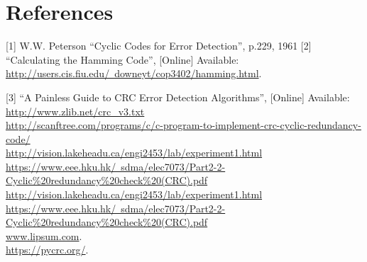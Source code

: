\documentclass[10pt,twocolumn,letterpaper]{article}
\begin{document}
\section{References}
[1]   W.W. Peterson “Cyclic Codes for Error Detection”, p.229, 1961 
[2] “Calculating the Hamming Code”, [Online] Available: 
\href{http://users.cis.fiu.edu/~downeyt/cop3402/hamming.html}{http://users.cis.fiu.edu/~downeyt/cop3402/hamming.html}. 

[3] “A Painless Guide to CRC Error Detection Algorithms”, [Online] Available:
\href{http://www.zlib.net/crc_v3.txt}{http://www.zlib.net/crc\_v3.txt}\\
\href{http://scanftree.com/programs/c/c-program-to-implement-crc-cyclic-redundancy-code/}{http://scanftree.com/programs/c/c-program-to-implement-crc-cyclic-redundancy-code/}\\
\href{http://vision.lakeheadu.ca/engi2453/lab/experiment1.html}{http://vision.lakeheadu.ca/engi2453/lab/experiment1.html}\\
\href{https://www.eee.hku.hk/~sdma/elec7073/Part2-2-Cyclic\%20redundancy\%20check\%20(CRC).pdf}{https://www.eee.hku.hk/~sdma/elec7073/Part2-2-Cyclic\%20redundancy\%20check\%20(CRC).pdf}\\
\href{http://vision.lakeheadu.ca/engi2453/lab/experiment1.html}{http://vision.lakeheadu.ca/engi2453/lab/experiment1.html}\\
\href{https://www.eee.hku.hk/~sdma/elec7073/Part2-2-Cyclic\%20redundancy\%20check\%20(CRC).pdf}{https://www.eee.hku.hk/~sdma/elec7073/Part2-2-Cyclic\%20redundancy\%20check\%20(CRC).pdf}\\
\href{www.lipsum.com}{www.lipsum.com}.\\
\href{https://pycrc.org/}{https://pycrc.org/}.
\end{document}
